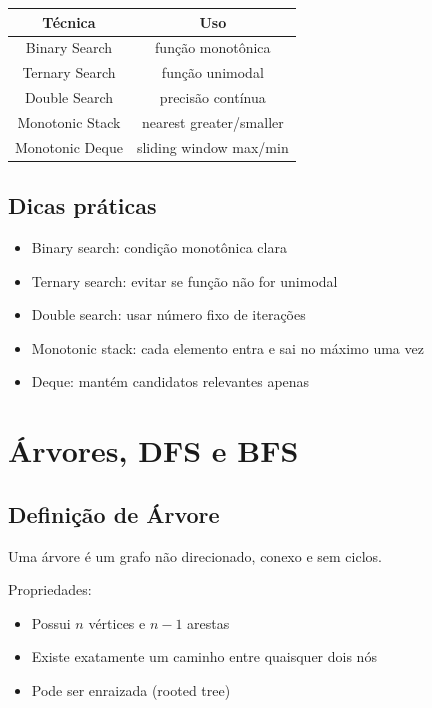 \documentclass[11pt]{article}
\begin{document}
\begin{center}
\begin{tabular}{|c|c|}
\hline
Técnica & Uso \\
\hline
Binary Search & função monotônica \\
Ternary Search & função unimodal \\
Double Search & precisão contínua \\
Monotonic Stack & nearest greater/smaller \\
Monotonic Deque & sliding window max/min \\
\hline
\end{tabular}
\end{center}

\subsection{Dicas práticas}

\begin{itemize}
    \item Binary search: condição monotônica clara
    \item Ternary search: evitar se função não for unimodal
    \item Double search: usar número fixo de iterações
    \item Monotonic stack: cada elemento entra e sai no máximo uma vez
    \item Deque: mantém candidatos relevantes apenas
\end{itemize}

\section{Árvores, DFS e BFS}

\subsection{Definição de Árvore}

Uma árvore é um grafo não direcionado, conexo e sem ciclos.

Propriedades:
\begin{itemize}
    \item Possui $n$ vértices e $n-1$ arestas
    \item Existe exatamente um caminho entre quaisquer dois nós
    \item Pode ser enraizada (rooted tree)
\end{itemize}
\end{document}
